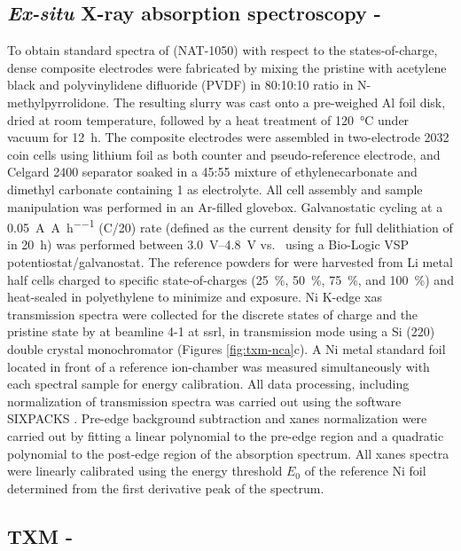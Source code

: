 \documentclass{WileyMSP-template}
\begin{document}
\subsection*{\textit{Ex-situ} X-ray absorption spectroscopy - \nca{}}
To obtain standard spectra of \nca{} (NAT-1050) with respect to the
states-of-charge, dense composite electrodes were fabricated by mixing
the pristine \nca{} with acetylene black and polyvinylidene difluoride
(PVDF) in 80:10:10 ratio in N-methylpyrrolidone. The resulting slurry
was cast onto a pre-weighed Al foil disk, dried at room temperature,
followed by a heat treatment of \SI{120}{\celsius} under vacuum for
\SI{12}{\hour}. The composite electrodes were assembled in
two-electrode 2032 coin cells using lithium foil as both counter and
pseudo-reference electrode, and Celgard 2400 separator soaked in a
45:55 mixture of ethylenecarbonate and dimethyl carbonate containing
\SI{1}{\molar}  as electrolyte. All cell assembly and sample
manipulation was performed in an Ar-filled glovebox. Galvanostatic
cycling at a \SI{0.05}{\ampere\per\ampere\per\hour} (C/20) rate
(defined as the current density for full delithiation of \nca{} in
\SI{20}{\hour}) was performed between \SIrange{3.0}{4.8}{\volt}
vs.\  using a Bio-Logic VSP potentiostat/galvanostat. The
reference powders for \nca{} were harvested from Li metal half cells
charged to specific state-of-charges (\SI{25}{\percent},
\SI{50}{\percent}, \SI{75}{\percent}, and \SI{100}{\percent}) and
heat-sealed in polyethylene to minimize  and 
exposure. Ni K-edge \gls{xas} transmission spectra were collected for
the discrete states of charge and the pristine state by at beamline
4-1 at \gls{ssrl}, in transmission mode using a Si (220) double
crystal monochromator (Figures \ref{fig:txm-nca}c). A Ni metal
standard foil located in front of a reference ion-chamber was measured
simultaneously with each spectral sample for energy calibration. All
data processing, including normalization of transmission spectra was
carried out using the software {SIXPACKS} \cite{lai2011}. Pre-edge
background subtraction and \gls{xanes} normalization were carried out
by fitting a linear polynomial to the pre-edge region and a quadratic
polynomial to the post-edge region of the absorption spectrum. All
\gls{xanes} spectra were linearly calibrated using the energy
threshold $E_0$ of the reference Ni foil determined from the first
derivative peak of the spectrum.


\subsection*{TXM - \nca{}}
\end{document}
